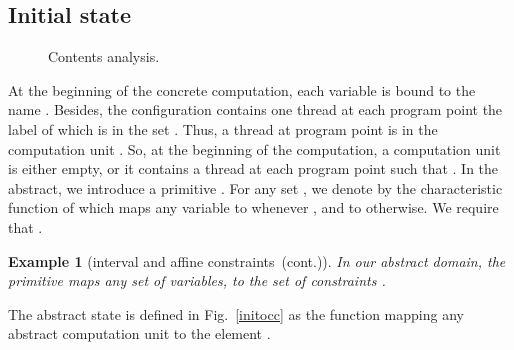 \documentclass{article}
\newcommand{\boxexample}{}
\newtheorem{example}[thm]{Example}
\newcommand{\continued}{(cont.)}
\newcommand{\countdom}{interval and affine constraints}
\newcommand{\ccount}{\countdom\ \continued}
\begin{document}
\subsection{Initial state}
\begin{figure*}[p]
\caption{Contents analysis.}
\label{absocc}
\end{figure*}
At the beginning of the concrete computation, 
 each variable  is bound to  the name . 
Besides, the configuration contains one thread at each program point the label of which is in the set . 
Thus, a thread at program point  is in the computation unit .
So, at the beginning of the computation, a computation unit  is either empty, or it contains a thread at each program point  such that . 
In the abstract, we introduce a primitive . For any set , we denote by  the characteristic function of  which  maps any variable  to  whenever , and to  otherwise. We require that .

\begin{example}[\ccount]
In our abstract domain, the primitive  maps any set  of variables, to the set of constraints .
\boxexample\end{example}

The abstract state  is defined in Fig.~\ref{initocc} as the function 
mapping any abstract computation unit  to the element  .
\end{document}
